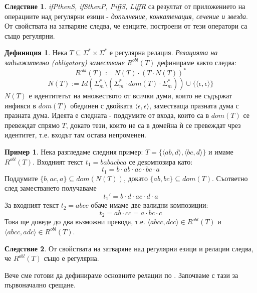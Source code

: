 \documentclass[12pt, oneside]{article}
\theoremstyle{definition}
\newtheorem{definition}{Дефиниция}[section]
\newtheorem{example}{Пример}[section]
\newtheorem{corollary}{Следствие}[section]
\begin{document}
\begin{corollary}
	\emph{ifPthenS, ifSthenP, PiffS, LiffR} са резултат от приложението на операциите над регулярни езици - \emph{допълнение, конкатенация, сечение и звезда}. От свойствата на затваряне следва, че езиците, построени от тези оператори са също регулярни.
\end{corollary}

\begin{definition}\label{def:Robl}
	Нека \(T \subseteq \Sigma^* \times \Sigma^* \) е регулярна релация. \emph{Релацията на задължително (obligatory) заместване} \(R^{obl}(T)\) дефинираме както следва:
	\[ R^{obl}(T) := N(T) \cdot (T \cdot N(T))^* \]
	\[ N(T) := Id(\Sigma_m^* \setminus (\Sigma_m^* \cdot dom(T) \cdot \Sigma_m^*)) \cup \{ \langle \epsilon, \epsilon \rangle \} \]
	\(N(T)\) е идентитетът на множеството от всички думи, които не съдържат инфикси в \(dom(T)\) обединен с двойката \(\langle \epsilon, \epsilon \rangle\), заместваща празната дума с празната дума.
	Идеята е следната - поддумите от входа, които са в \(dom(T)\) се превеждат спрямо \(T\), докато тези, които не са в домейна ѝ се превеждат чрез идентитет, т.е. входът там остава непроменен.
\end{definition}

\begin{example}
	Нека разгледаме следния пример: \(T = \{ \langle ab, d \rangle, \langle bc, d \rangle \} \) и имаме \(R^{obl}(T) \). Входният текст \( t_1 = babacbca \) се декомпозира като:
	\[ t_1 = b \cdot ab \cdot ac \cdot bc \cdot a \]
	Поддумите \(\{b, ac, a\} \subseteq dom(N(T))\), докато \(\{ab, bc\} \subseteq dom(T)\). Съответно след заместването получаваме
	\[ t_1' = b \cdot d \cdot ac \cdot d \cdot a \]
	За входният текст \( t_2 = abcc \) обаче имаме две валидни композиции:
	\[ t_2 = ab \cdot cc = a \cdot bc \cdot c \]
	Това ще доведе до два възможни превода, т.е. \( \langle abcc, dcc \rangle \in R^{obl}(T) \) и \( \langle abcc, adc \rangle \in R^{obl}(T) \).
\end{example}

\begin{corollary}
	От свойствата на затваряне над регулярни езици и релации следва, че \(R^{obl}(T)\) също е регулярна.
\end{corollary}

Вече сме готови да дефинираме основните релации по \cite{Karttunen:96}. Започваме с тази за първоначално срещане.
\end{document}
